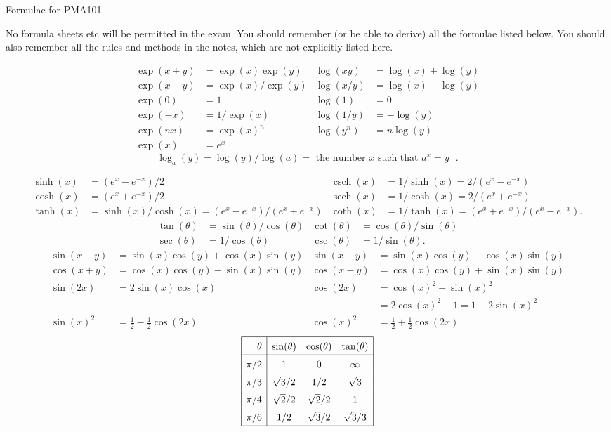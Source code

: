 \documentclass{amsart}
\newcommand{\csch}{\operatorname{csch}}
\newcommand{\sech}{\operatorname{sech}}
\newcommand{\tht}{\theta}
\newcommand{\rr}{\sqrt{3}}
\newcommand{\rt}{\sqrt{2}}
\renewcommand{\:}{\colon}
\begin{document}
\begin{center}
 {\Huge Formulae for PMA101}
\end{center}

No formula sheets etc will be permitted in the exam.  You should
remember (or be able to derive) all the formulae listed below.  You
should also remember all the rules and methods in the notes, which are
not explicitly listed here.

\begin{align*}
 \exp(x+y) &= \exp(x) \exp(y) & \log(xy)  &= \log(x) + \log(y) \\ 
 \exp(x-y) &= \exp(x)/\exp(y) & \log(x/y) &= \log(x) - \log(y) \\ 
 \exp(0)   &= 1               & \log(1)   &= 0 \\                 
 \exp(-x)  &= 1/\exp(x)       & \log(1/y) &= -\log(y) \\          
 \exp(nx)  &= \exp(x)^n       & \log(y^n) &= n\log(y) \\
 \exp(x)   &= e^x             &
\end{align*}
\[ \log_a(y) = \log(y)/\log(a) =
    \text{ the number $x$ such that $a^x=y$ }.
\]

\begin{align*}
 \sinh(x) &= (e^x - e^{-x})/2 &
 \csch(x) &= 1/\sinh(x) = 2/(e^x-e^{-x}) \\
 \cosh(x) &= (e^x + e^{-x})/2 &
 \sech(x) &= 1/\cosh(x) = 2/(e^x+e^{-x}) \\
 \tanh(x) &= \sinh(x)/\cosh(x) = (e^x-e^{-x})/(e^x+e^{-x}) &
 \coth(x) &= 1/\tanh(x) = (e^x+e^{-x})/(e^x-e^{-x}).
\end{align*}
\begin{align*}
 \tan(\tht) &= \sin(\tht)/\cos(\tht) &
 \cot(\tht) &= \cos(\tht)/\sin(\tht) \\
 \sec(\tht) &= 1/\cos(\tht) &
 \csc(\tht) &= 1/\sin(\tht).
\end{align*}
\begin{align*}
 \sin(x+y) &= \sin(x)\cos(y) + \cos(x)\sin(y) &
 \sin(x-y) &= \sin(x)\cos(y) - \cos(x)\sin(y) \\
 \cos(x+y) &= \cos(x)\cos(y) - \sin(x)\sin(y) &
 \cos(x-y) &= \cos(x)\cos(y) + \sin(x)\sin(y) \\
 \sin(2x)  &= 2\sin(x)\cos(x) &
 \cos(2x)  &= \cos(x)^2 - \sin(x)^2  \\
  &&       &= 2\cos(x)^2-1 = 1-2\sin(x)^2 \\
 \sin(x)^2 &= \tfrac{1}{2} - \tfrac{1}{2}\cos(2x) &
 \cos(x)^2 &= \tfrac{1}{2} + \tfrac{1}{2}\cos(2x)
\end{align*}
\[ \renewcommand{\arraystretch}{1.5}
   \begin{array}{|r|ccc|}
    \hline
    \tht  & \sin(\tht)  & \cos(\tht) & \tan(\tht) \\
    \hline
    \pi/2 & 1           & 0           & \infty    \\
    \pi/3 & \rr/2       & 1/2         & \rr       \\
    \pi/4 & \rt/2       & \rt/2       & 1         \\
    \pi/6 & 1/2         & \rr/2       & \rr/3     \\
    \hline
  \end{array}
\]
\end{document}
